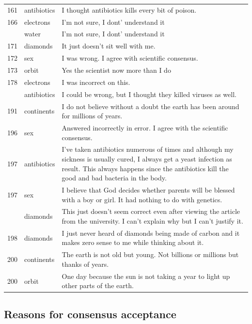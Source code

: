 \documentclass[
  doc,floatsintext]{apa6}
\begin{document}
\begin{longtable}[t]{>{}r>{}l>{\raggedright\arraybackslash}p{30em}}
161 & antibiotics & I thought antibiotics kills every bit of poison.\\
166 & electrons & I'm not sure, I dont' understand it\\
\addlinespace
166 & water & I'm not sure, I dont' understand it\\
171 & diamonds & It just doesn't sit well with me.\\
172 & sex & I was wrong. I agree with scientific consensus.\\
173 & orbit & Yes the scientist now more than I do\\
178 & electrons & I was incorrect on this.\\
\addlinespace
191 & antibiotics & I could be wrong, but I thought they killed viruses as well.\\
191 & continents & I do not believe without a doubt the earth has been around for millions of years.\\
196 & sex & Answered incorrectly in error.  I agree with the scientific consensus.\\
197 & antibiotics & I’ve taken antibiotics numerous of times and although my sickness is usually cured, I always get a yeast infection as result. This always happens since the antibiotics kill the good and bad bacteria in the body.\\
197 & sex & I believe that God decides whether parents will be blessed with a boy or girl. It had nothing to do with genetics.\\
\addlinespace
197 & diamonds & This just doesn’t seem correct even after viewing the article from the university. I can’t explain why but I can’t justify it.\\
198 & diamonds & I just never heard of diamonds being made of carbon and it makes zero sense to me while thinking about it.\\
200 & continents & The earth is not old but young. Not billions or millions but thanks of years.\\
200 & orbit & One day because the sun is not taking a year to light up other parts of the earth.\\
\bottomrule
\end{longtable}

\subsection{Reasons for consensus acceptance}\label{reasons-for-consensus-acceptance}
\end{document}

